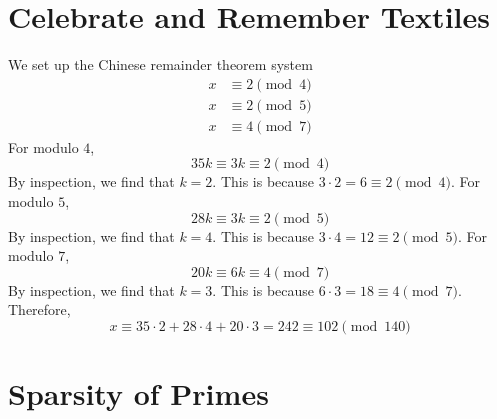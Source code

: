 \documentclass{article}
\begin{document}
\section{Celebrate and Remember Textiles}

We set up the Chinese remainder theorem system
\begin{align}
    x &\equiv 2 \pmod{4} \\
    x &\equiv 2 \pmod{5} \\
    x &\equiv 4 \pmod{7}
\end{align}
For modulo \(4\),
\begin{equation}
    35k \equiv 3k \equiv 2 \pmod{4}
\end{equation}
By inspection, we find that \(k = 2\).
This is because \(3 \cdot 2 = 6 \equiv 2 \pmod{4}\).
For modulo \(5\),
\begin{equation}
    28k \equiv 3k \equiv 2 \pmod{5}
\end{equation}
By inspection, we find that \(k = 4\).
This is because \(3 \cdot 4 = 12 \equiv 2 \pmod{5}\).
For modulo \(7\),
\begin{equation}
    20k \equiv 6k \equiv 4 \pmod{7}
\end{equation}
By inspection, we find that \(k = 3\).
This is because \(6 \cdot 3 = 18 \equiv 4 \pmod{7}\).
Therefore,
\begin{equation}
    x \equiv 35 \cdot 2 + 28 \cdot 4 + 20 \cdot 3 = 242 \equiv 102 \pmod{140}
\end{equation}

\section{Sparsity of Primes}
\end{document}
